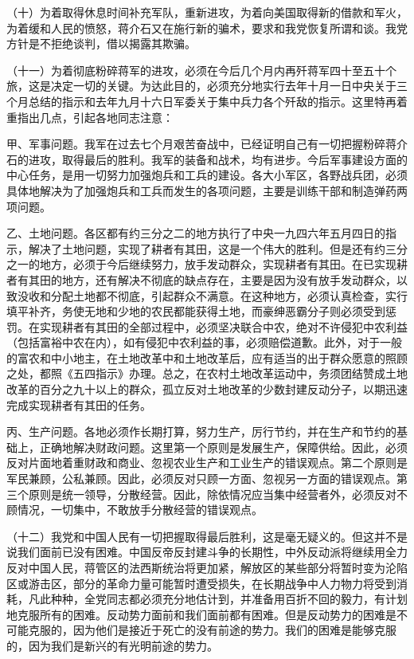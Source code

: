 （十）为着取得休息时间补充军队，重新进攻，为着向美国取得新的借款和军火，为着缓和人民的愤怒，蒋介石又在施行新的骗术，要求和我党恢复所谓和谈。我党方针是不拒绝谈判，借以揭露其欺骗。

（十一）为着彻底粉碎蒋军的进攻，必须在今后几个月内再歼蒋军四十至五十个旅，这是决定一切的关键。为达此目的，必须充分地实行去年十月一日中央关于三个月总结的指示和去年九月十六日军委关于集中兵力各个歼敌的指示。这里特再着重指出几点，引起各地同志注意：

甲、军事问题。我军在过去七个月艰苦奋战中，已经证明自己有一切把握粉碎蒋介石的进攻，取得最后的胜利。我军的装备和战术，均有进步。今后军事建设方面的中心任务，是用一切努力加强炮兵和工兵的建设。各大小军区，各野战兵团，必须具体地解决为了加强炮兵和工兵而发生的各项问题，主要是训练干部和制造弹药两项问题。

乙、土地问题。各区都有约三分之二的地方执行了中央一九四六年五月四日的指示，解决了土地问题，实现了耕者有其田，这是一个伟大的胜利。但是还有约三分之一的地方，必须于今后继续努力，放手发动群众，实现耕者有其田。在已实现耕者有其田的地方，还有解决不彻底的缺点存在，主要是因为没有放手发动群众，以致没收和分配土地都不彻底，引起群众不满意。在这种地方，必须认真检查，实行填平补齐，务使无地和少地的农民都能获得土地，而豪绅恶霸分子则必须受到惩罚。在实现耕者有其田的全部过程中，必须坚决联合中农，绝对不许侵犯中农利益（包括富裕中农在内），如有侵犯中农利益的事，必须赔偿道歉。此外，对于一般的富农和中小地主，在土地改革中和土地改革后，应有适当的出于群众愿意的照顾之处，都照《五四指示》办理。总之，在农村土地改革运动中，务须团结赞成土地改革的百分之九十以上的群众，孤立反对土地改革的少数封建反动分子，以期迅速完成实现耕者有其田的任务。

丙、生产问题。各地必须作长期打算，努力生产，厉行节约，并在生产和节约的基础上，正确地解决财政问题。这里第一个原则是发展生产，保障供给。因此，必须反对片面地着重财政和商业、忽视农业生产和工业生产的错误观点。第二个原则是军民兼顾，公私兼顾。因此，必须反对只顾一方面、忽视另一方面的错误观点。第三个原则是统一领导，分散经营。因此，除依情况应当集中经营者外，必须反对不顾情况，一切集中，不敢放手分散经营的错误观点。

（十二）我党和中国人民有一切把握取得最后胜利，这是毫无疑义的。但这并不是说我们面前已没有困难。中国反帝反封建斗争的长期性，中外反动派将继续用全力反对中国人民，蒋管区的法西斯统治将更加紧，解放区的某些部分将暂时变为沦陷区或游击区，部分的革命力量可能暂时遭受损失，在长期战争中人力物力将受到消耗，凡此种种，全党同志都必须充分地估计到，并准备用百折不回的毅力，有计划地克服所有的困难。反动势力面前和我们面前都有困难。但是反动势力的困难是不可能克服的，因为他们是接近于死亡的没有前途的势力。我们的困难是能够克服的，因为我们是新兴的有光明前途的势力。



